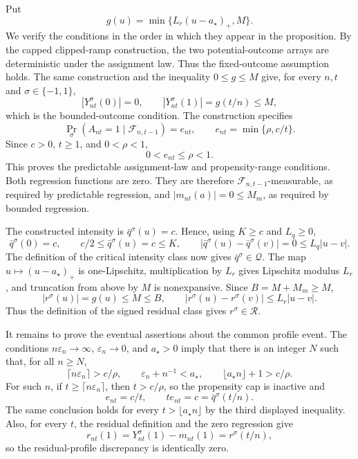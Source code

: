 Put
\[
g(u)=\min\{L_r(u-a_\star)_+,M\}.
\]
We verify the conditions in the order in which they appear in the proposition.  By the capped clipped-ramp construction, the two potential-outcome arrays are deterministic under the assignment law.  Thus the fixed-outcome assumption holds.  The same construction and the inequality \(0\le g\le M\) give, for every \(n,t\) and \(\sigma\in\{-1,1\}\),
\[
 |Y_{nt}^\sigma(0)|=0,
 \qquad
 |Y_{nt}^\sigma(1)|=g(t/n)\le M,
\]
which is the bounded-outcome condition.  The construction specifies
\[
 \Pr_\sigma(A_{nt}=1\mid\mathcal F_{n,t-1})=e_{nt},
 \qquad e_{nt}=\min\{\rho,c/t\}.
\]
Since \(c>0\), \(t\ge1\), and \(0<\rho<1\),
\[
 0<e_{nt}\le\rho<1.
\]
This proves the predictable assignment-law and propensity-range conditions.  Both regression functions are zero.  They are therefore \(\mathcal F_{n,t-1}\)-measurable, as required by predictable regression, and \(|m_{nt}(a)|=0\le M_m\), as required by bounded regression.

The constructed intensity is \(\bar q^\sigma(u)=c\).  Hence, using \(K\ge c\) and \(L_q\ge0\),
\[
 \bar q^\sigma(0)=c,
 \qquad
 c/2\le \bar q^\sigma(u)=c\le K,
 \qquad
 |\bar q^\sigma(u)-\bar q^\sigma(v)|=0\le L_q|u-v|.
\]
The definition of the critical intensity class now gives \(\bar q^\sigma\in\mathcal Q\).  The map \(u\mapsto(u-a_\star)_+\) is one-Lipschitz, multiplication by \(L_r\) gives Lipschitz modulus \(L_r\), and truncation from above by \(M\) is nonexpansive.  Since \(B=M+M_m\ge M\),
\[
 |r^\sigma(u)|=g(u)\le M\le B,
 \qquad
 |r^\sigma(u)-r^\sigma(v)|\le L_r|u-v|.
\]
Thus the definition of the signed residual class gives \(r^\sigma\in\mathcal R\).

It remains to prove the eventual assertions about the common profile event.  The conditions \(n\varepsilon_n\to\infty\), \(\varepsilon_n\to0\), and \(a_\star>0\) imply that there is an integer \(N\) such that, for all \(n\ge N\),
\[
 \lceil n\varepsilon_n\rceil>c/\rho,
 \qquad
 \varepsilon_n+n^{-1}<a_\star,
 \qquad
 \lfloor a_\star n\rfloor+1>c/\rho.
\]
For such \(n\), if \(t\ge\lceil n\varepsilon_n\rceil\), then \(t>c/\rho\), so the propensity cap is inactive and
\[
 e_{nt}=c/t,
 \qquad
 t e_{nt}=c=\bar q^\sigma(t/n).
\]
The same conclusion holds for every \(t>\lfloor a_\star n\rfloor\) by the third displayed inequality.  Also, for every \(t\), the residual definition and the zero regression give
\[
 r_{nt}(1)=Y_{nt}^\sigma(1)-m_{nt}(1)=r^\sigma(t/n),
\]
so the residual-profile discrepancy is identically zero.

